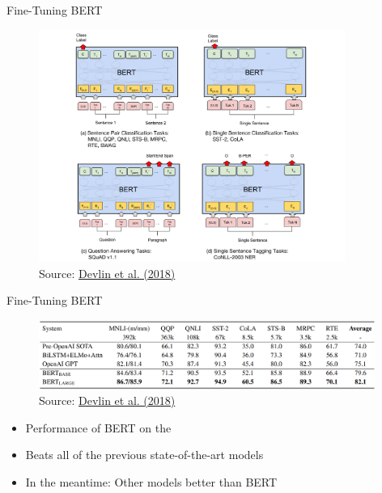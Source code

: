 
\begin{frame}{Fine-Tuning BERT}
	\begin{figure}
	\centering
		\includegraphics[width = 10cm]{figure/bert-finetune.png}\\ 
		\footnotesize{Source:} \href{https://arxiv.org/pdf/1810.04805.pdf}{\footnotesize Devlin et al. (2018)}
	\end{figure}
\end{frame}



\begin{frame}{Fine-Tuning BERT}

\vspace{1.5cm}

	\begin{figure}
	\centering
		\includegraphics[width = 11cm]{figure/bert-sota.png}\\ 
		\footnotesize{Source:} \href{https://arxiv.org/pdf/1810.04805.pdf}{\footnotesize Devlin et al. (2018)}
	\end{figure}
\begin{itemize}
	\item Performance of BERT on the \href{https://gluebenchmark.com/}{}
	\item Beats all of the previous state-of-the-art models
	\item In the meantime: Other models better than BERT
\end{itemize}

\end{frame}

